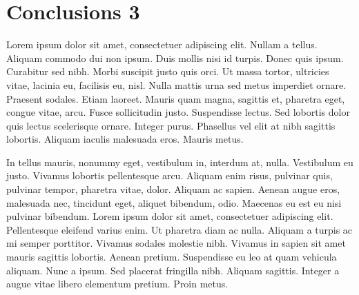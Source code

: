 \chapter{Conclusions 3}
\label{c:conclusions} Lorem ipsum dolor sit amet, consectetuer adipiscing
elit. Nullam a tellus. Aliquam commodo dui non ipsum. Duis mollis nisi id
turpis. Donec quis ipsum. Curabitur sed nibh. Morbi suscipit justo quis orci.
Ut massa tortor, ultricies vitae, lacinia eu, facilisis eu, nisl. Nulla mattis
urna sed metus imperdiet ornare. Praesent sodales. Etiam laoreet. Mauris quam
magna, sagittis et, pharetra eget, congue vitae, arcu. Fusce sollicitudin
justo. Suspendisse lectus. Sed lobortis dolor quis lectus scelerisque ornare.
Integer purus. Phasellus vel elit at nibh sagittis lobortis. Aliquam iaculis
malesuada eros. Mauris metus.

In tellus mauris, nonummy eget, vestibulum in, interdum at, nulla. Vestibulum
eu justo. Vivamus lobortis pellentesque arcu. Aliquam enim risus, pulvinar
quis, pulvinar tempor, pharetra vitae, dolor. Aliquam ac sapien. Aenean augue
eros, malesuada nec, tincidunt eget, aliquet bibendum, odio. Maecenas eu est eu
nisi pulvinar bibendum. Lorem ipsum dolor sit amet, consectetuer adipiscing
elit. Pellentesque eleifend varius enim. Ut pharetra diam ac nulla. Aliquam a
turpis ac mi semper porttitor. Vivamus sodales molestie nibh. Vivamus in sapien
sit amet mauris sagittis lobortis. Aenean pretium. Suspendisse eu leo at quam
vehicula aliquam. Nunc a ipsum. Sed placerat fringilla nibh. Aliquam sagittis.
Integer a augue vitae libero elementum pretium. Proin metus.
